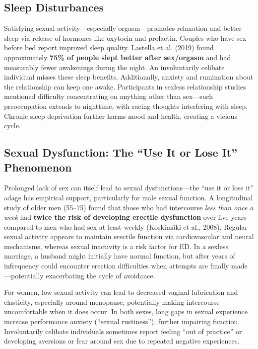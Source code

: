 \documentclass[12pt,openany]{book}
\numberwithin{equation}{chapter}
\begin{document}
\subsection{Sleep Disturbances}

Satisfying sexual activity---especially orgasm---promotes relaxation and better sleep via release of hormones like oxytocin and prolactin. Couples who have sex before bed report improved sleep quality. Lastella et al. (2019) found approximately \textbf{75\% of people slept better after sex/orgasm} and had measurably fewer awakenings during the night. An involuntarily celibate individual misses these sleep benefits. Additionally, anxiety and rumination about the relationship can keep one awake. Participants in sexless relationship studies mentioned difficulty concentrating on anything other than sex---such preoccupation extends to nighttime, with racing thoughts interfering with sleep. Chronic sleep deprivation further harms mood and health, creating a vicious cycle.

\subsection{Sexual Dysfunction: The ``Use It or Lose It'' Phenomenon}

Prolonged lack of sex can itself lead to sexual dysfunctions---the ``use it or lose it'' adage has empirical support, particularly for male sexual function. A longitudinal study of older men (55--75) found that those who had intercourse \textit{less than once a week} had \textbf{twice the risk of developing erectile dysfunction} over five years compared to men who had sex at least weekly (Koskimäki et al., 2008). Regular sexual activity appears to maintain erectile function via cardiovascular and neural mechanisms, whereas sexual inactivity is a risk factor for ED. In a sexless marriage, a husband might initially have normal function, but after years of infrequency could encounter erection difficulties when attempts are finally made---potentially exacerbating the cycle of avoidance.

For women, low sexual activity can lead to decreased vaginal lubrication and elasticity, especially around menopause, potentially making intercourse uncomfortable when it does occur. In both sexes, long gaps in sexual experience increase performance anxiety (``sexual rustiness''), further impairing function. Involuntarily celibate individuals sometimes report feeling ``out of practice'' or developing aversions or fear around sex due to repeated negative experiences.
\end{document}

